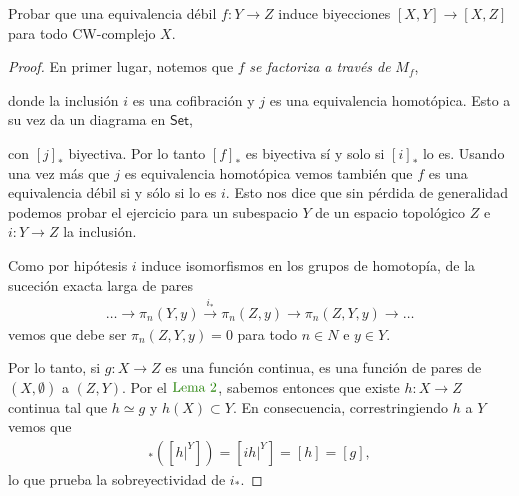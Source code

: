 \documentclass[11pt]{article}
\newcommand{\cat}[1]{\mathsf{#1}}
\newcommand{\paint}[1]{\color{color}{#1}}
\newenvironment{exercise}[2][Ejercicio]{\begin{trivlist}
\item[\hskip \labelsep \paint{{\bfseries #1}}\hskip \labelsep {\bfseries #2.}]}{\end{trivlist}}
\begin{document}
\begin{exercise}{4} Probar que una equivalencia débil $f : Y \to Z$ induce biyecciones $[X,Y] \to [X,Z]$ para todo CW-complejo $X$.
\end{exercise}
\begin{proof} En primer lugar, notemos que $f$ \textit{se factoriza a través de} $M_f$, 
\begin{center}
\end{center}
donde la inclusión $i$ es una cofibración y $j$ es una equivalencia homotópica. Esto a su vez da un diagrama en $\cat{Set}$,
\begin{center}
\end{center}

con $[j]_*$ biyectiva. Por lo tanto $[f]_*$ es biyectiva sí y solo si $[i]_*$ lo es. Usando una vez más que $j$ es equivalencia homotópica vemos también que $f$ es una equivalencia débil si y sólo si lo es $i$. Esto nos dice que sin pérdida de generalidad podemos probar el ejercicio para un subespacio $Y$ de un espacio topológico $Z$ e $i : Y \to Z$ la inclusión.

Como por hipótesis $i$ induce isomorfismos en los grupos de homotopía, de la suceción exacta larga de pares
\begin{align*}
\dots \to \pi_n(Y,y) \xrightarrow{i_*} \pi_n(Z,y) \to \pi_n(Z,Y,y) \to \dots
\end{align*}
vemos que debe ser $\pi_n(Z,Y,y) = 0$ para todo $n \in N$ e $y \in Y$.	

Por lo tanto, si $g : X \to Z$ es una función continua, es una función de pares de $(X, \emptyset)$ a $(Z,Y)$. Por el $\paint{\text{Lema $2$}}$, sabemos entonces que existe $h : X \to Z$ continua tal que $h \simeq g$ y $h(X) \subset Y$. En consecuencia, correstringiendo $h$ a $Y$ vemos que
\begin{align*}
[i]_*\left([h|^Y]\right) = [ih|^Y] = [h] =  [g],
\end{align*}
lo que prueba la sobreyectividad de $i_*$.


\end{proof}
\end{document}
